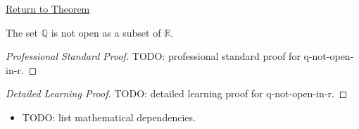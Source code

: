 \newpage
{}
\label{prf:q-not-open-in-r}

\begin{remark*}[Return]
\hyperref[cor:q-not-open-in-r]{Return to Theorem}
\end{remark*}

\begin{corollary*}
The set $\mathbb{Q}$ is not open as a subset of $\mathbb{R}$.
\end{corollary*}

\begin{proof}[Professional Standard Proof]
\LRAProofBodyStart
TODO: professional standard proof for q-not-open-in-r.
\end{proof}

\begin{proof}[Detailed Learning Proof]
\LRAProofBodyStart
TODO: detailed learning proof for q-not-open-in-r.
\end{proof}

\begin{remark*}
\end{remark*}

\begin{dependencies}
\begin{itemize}
  \item TODO: list mathematical dependencies.
\end{itemize}
\end{dependencies}

\clearpage
